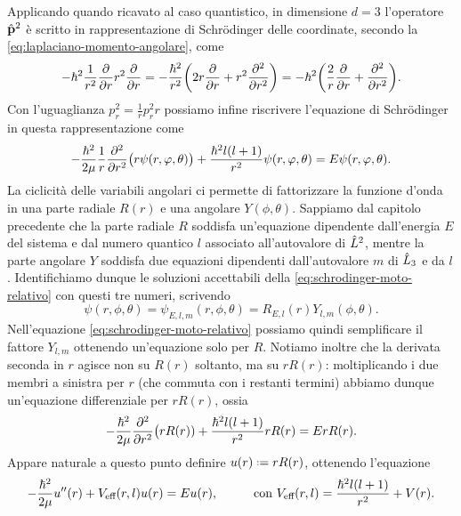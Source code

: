 Applicando quando ricavato al caso quantistico, in dimensione $d=3$ l'operatore $\hat{\mathbf{p}}^2$ è scritto in rappresentazione di Schr\"odinger delle coordinate, secondo la \eqref{eq:laplaciano-momento-angolare}, come
\begin{equation}
	-\hbar^2\frac1{r^2}\frac{\partial {}}{\partial {r}}r^2\frac{\partial {}}{\partial {r}}=-\frac{\hbar^2}{r^2}\bigg(2r\frac{\partial {}}{\partial {r}}+r^2\frac{\partial^2 {}}{\partial {r}^2}\bigg)=-\hbar^2\bigg(\frac2{r}\frac{\partial {}}{\partial {r}}+\frac{\partial^2 {}}{\partial {r}^2}\bigg).
\end{equation}
Con l'uguaglianza $p_r^2=\frac1{r}p_r^2r$ possiamo infine riscrivere l'equazione di Schr\"odinger in questa rappresentazione come
\begin{equation}
	-\frac{\hbar^2}{2\mu}\frac1{r}\frac{\partial^2 {}}{\partial {r}^2}\big(r\psi(r,\varphi,\theta)\big)+\frac{\hbar^2l(l+1)}{r^2}\psi(r,\varphi,\theta)=E\psi(r,\varphi,\theta).
	\label{eq:schrodinger-moto-relativo}
\end{equation}
La ciclicità delle variabili angolari ci permette di fattorizzare la funzione d'onda in una parte radiale $R(r)$ e una angolare $Y(\phi,\theta)$.
Sappiamo dal capitolo precedente che la parte radiale $R$ soddisfa un'equazione dipendente dall'energia $E$ del sistema e dal numero quantico $l$ associato all'autovalore di $\hat{L}^2$, mentre la parte angolare $Y$ soddisfa due equazioni dipendenti dall'autovalore $m$ di $\hat{L}_3$ e da $l$.
Identifichiamo dunque le soluzioni accettabili della \eqref{eq:schrodinger-moto-relativo} con questi tre numeri, scrivendo
\begin{equation}
	\psi(r,\phi,\theta)=\psi_{E,l,m}(r,\phi,\theta)=R_{E,l}(r)Y_{l,m}(\phi,\theta).
	\label{eq:fattorizzazione-wf-radiale-angolare}
\end{equation}
Nell'equazione \eqref{eq:schrodinger-moto-relativo} possiamo quindi semplificare il fattore $Y_{l,m}$ ottenendo un'equazione solo per $R$.
Notiamo inoltre che la derivata seconda in $r$ agisce non su $R(r)$ soltanto, ma su $rR(r)$: moltiplicando i due membri a sinistra per $r$ (che commuta con i restanti termini) abbiamo dunque un'equazione differenziale per $rR(r)$, ossia
\begin{equation}
	-\frac{\hbar^2}{2\mu}\frac{\partial^2 {}}{\partial {r}^2}\big(rR(r))+\frac{\hbar^2l(l+1)}{r^2}rR(r)=ErR(r).
\end{equation}
Appare naturale a questo punto definire $u(r)\defeq rR(r)$, ottenendo l'equazione
\begin{equation}
	-\frac{\hbar^2}{2\mu}u''(r)+V_\textup{eff}(r,l)u(r)=Eu(r),\hspace{1cm}\text{con }V_\textup{eff}(r,l)=\frac{\hbar^2l(l+1)}{r^2}+V(r).
	\label{eq:schrodinger-moto-relativo-potenziale-efficace}
\end{equation}
